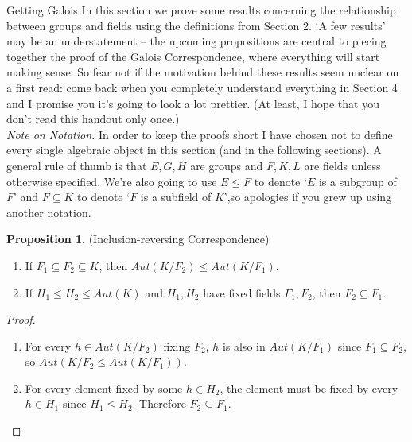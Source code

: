 \documentclass[12pt]{article}
\theoremstyle{definition}
\theoremstyle{definition}
\theoremstyle{definition}
\theoremstyle{definition}
\theoremstyle{definition}
\newtheorem{proposition}{Proposition}[section]
\theoremstyle{definition}
\begin{document}
\newpage

\begin{section}{Getting Galois}
    In this section we prove some results concerning the relationship between groups and fields using the definitions from Section 2. `A few results' may be an understatement -- the upcoming propositions 
    are central to piecing together the proof of the Galois Correspondence, where everything will start making sense. So fear not if the motivation behind these results seem unclear on a first read: 
    come back when you completely understand everything in Section 4 and I promise you it's going to look a lot prettier. (At least, I hope that you don't read this handout only once.)\\

    \textit{Note on Notation.} In order to keep the proofs short I have chosen not to define every single algebraic object in this section (and in the following sections). A general rule of thumb 
    is that \(E,G,H\) are groups and \(F,K,L\) are fields unless otherwise specified. We're also going to use \(E \leq F\) to denote `\(E\) is a subgroup of \(F\)' and \(F\subseteq K\) to denote 
    `\(F\) is a subfield of \(K\)',so apologies if you grew up using another notation.

    \begin{proposition}{(Inclusion-reversing Correspondence)}
        \begin{enumerate}
            \item If \(F_1 \subseteq F_2 \subseteq K\), then \(Aut(K/F_2) \leq Aut(K/F_1)\).
            \item If \(H_1 \leq H_2 \leq Aut(K)\) and \(H_1, H_2\) have fixed fields \(F_1, F_2\), then \(F_2 \subseteq F_1\).
        \end{enumerate}

        \begin{proof}
            \begin{enumerate}
                \item For every \(h\in Aut(K/F_2)\) fixing \(F_2\), \(h\) is also in \(Aut(K/F_1)\) since \(F_1 \subseteq F_2\), so \(Aut(K/F_2 \leq Aut(K/F_1))\).
                \item For every element fixed by some \(h\in H_2\), the element must be fixed by every \(h\in H_1\) since \(H_1 \leq H_2\). Therefore \(F_2 \subseteq F_1\). 
            \end{enumerate}
        \end{proof}
    \end{proposition}


\end{section}
\end{document}
